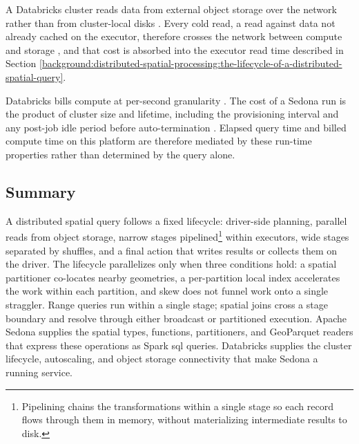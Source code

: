 A Databricks cluster reads data from external object storage over the network rather than from cluster-local disks \parencite{databricks2025_lakehouse, pang2024_storage_disaggregated_databases}. Every cold read, a read against data not already cached on the executor, therefore crosses the network between compute and storage \parencite{pang2024_storage_disaggregated_databases}, and that cost is absorbed into the executor read time described in Section \ref{background:distributed-spatial-processing:the-lifecycle-of-a-distributed-spatial-query}.

Databricks bills compute at per-second granularity \parencite{databricks2024_pricing}. The cost of a Sedona run is the product of cluster size and lifetime, including the provisioning interval \parencite{databricks2024_pool_index} and any post-job idle period before auto-termination \parencite{databricks2024_compute_configuration}. Elapsed query time and billed compute time on this platform are therefore mediated by these run-time properties rather than determined by the query alone.

\subsection{Summary}
\label{background:distributed-spatial-processing:summary}
A distributed spatial query follows a fixed lifecycle: driver-side planning, parallel reads from object storage, narrow stages pipelined\footnote{Pipelining chains the transformations within a single stage so each record flows through them in memory, without materializing intermediate results to disk.} within executors, wide stages separated by shuffles, and a final action that writes results or collects them on the driver. The lifecycle parallelizes only when three conditions hold: a spatial partitioner co-locates nearby geometries, a per-partition local index accelerates the work within each partition, and skew does not funnel work onto a single straggler. Range queries run within a single stage; spatial joins cross a stage boundary and resolve through either broadcast or partitioned execution. Apache Sedona supplies the spatial types, functions, partitioners, and GeoParquet readers that express these operations as Spark \acrshort{sql} queries. Databricks supplies the cluster lifecycle, autoscaling, and object storage connectivity that make Sedona a running service.